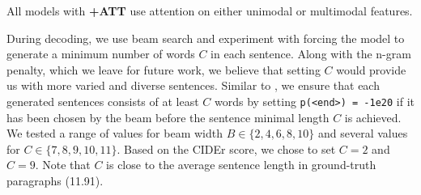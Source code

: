 \documentclass[11pt,a4paper]{article}
\begin{document}
All models with \textbf{+ATT} use attention on either unimodal or multimodal features.

During decoding, we use beam search \cite{beam17} and experiment with forcing the model to generate a minimum number of words $C$ in each sentence.
Along with the n-gram penalty, which we leave for future work, we believe that setting $C$ would provide us with more varied and diverse sentences.
Similar to , we ensure that each generated sentences consists of at least $C$ words by setting \verb|p(<end>) = -1e20| if it has been chosen by the beam before the sentence minimal length $C$ is achieved.
We tested a range of values for beam width $B \in \{2, 4, 6, 8, 10\}$ and several values for $C \in \{7, 8, 9, 10, 11 \}$.
Based on the CIDEr score, we chose to set $C=2$ and $C=9$.
Note that $C$ is close to the average sentence length in ground-truth paragraphs (11.91).

\end{document}
